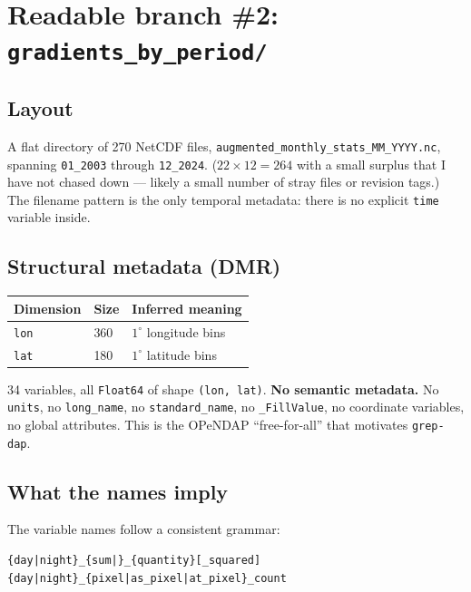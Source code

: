 \documentclass[11pt]{article}
\begin{document}
\section{Readable branch \#2: \texttt{gradients\_by\_period/}}\label{sec:gradients}

\subsection{Layout}

A flat directory of 270 NetCDF files,
\texttt{augmented\_monthly\_stats\_MM\_YYYY.nc}, spanning
\texttt{01\_2003} through \texttt{12\_2024}. ($22 \times 12 = 264$
with a small surplus that I have not chased down --- likely a small
number of stray files or revision tags.) The filename pattern is
the only temporal metadata: there is no explicit
\texttt{time} variable inside.

\subsection{Structural metadata (DMR)}

\begin{center}
\begin{tabular}{@{}lll@{}}
\toprule
Dimension & Size & Inferred meaning \\
\midrule
\texttt{lon} & 360 & $1^\circ$ longitude bins \\
\texttt{lat} & 180 & $1^\circ$ latitude bins \\
\bottomrule
\end{tabular}
\end{center}

34 variables, all \texttt{Float64} of shape \texttt{(lon, lat)}.
\textbf{No semantic metadata.} No \texttt{units}, no \texttt{long\_name},
no \texttt{standard\_name}, no \texttt{\_FillValue}, no
coordinate variables, no global attributes. This is the OPeNDAP
``free-for-all'' that motivates \texttt{grep-dap}.

\subsection{What the names imply}

The variable names follow a consistent grammar:

\begin{lstlisting}
{day|night}_{sum|}_{quantity}[_squared]
{day|night}_{pixel|as_pixel|at_pixel}_count
\end{lstlisting}
\end{document}
